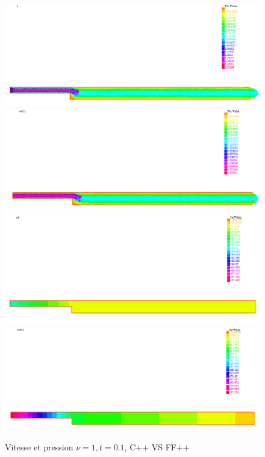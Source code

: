 \documentclass[a4paper,12pt]{article}
\begin{document}
\begin{figure}[!t]
	\caption{Vitesse et pression $\nu = 1,t=0.1$, C++ VS FF++}
	\centering
	\includegraphics[width=0.49\linewidth]{image/c++_NS_nu=1_t=1_u.png}
	\includegraphics[width=0.49\linewidth]{image/ff++_NS_nu=1_t=1_u.png}
	\includegraphics[width=0.49\linewidth]{image/c++_NS_nu=1_t=1_p.png}
	\includegraphics[width=0.49\linewidth]{image/ff++_NS_nu=1_t=1_p.png}
\end{figure}
\end{document}
